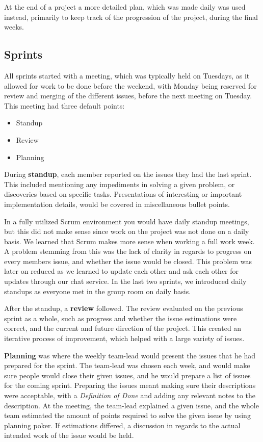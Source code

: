 At the end of a project a more detailed plan, which was made daily was used instead, primarily to keep track of the progression of the project, during the final weeks.

\subsection{Sprints}
All sprints started with a meeting, which was typically held on Tuesdays, as it allowed for work to be done before the weekend, with Monday being reserved for review and merging of the different issues, before the next meeting on Tuesday.
This meeting had three default points:
\begin{itemize}
	\item Standup
	\item Review
	\item Planning
\end{itemize}

During \textbf{standup}, each member reported on the issues they had the last sprint.
This included mentioning any impediments in solving a given problem, or discoveries based on specific tasks.
Presentations of interesting or important implementation details, would be covered in miscellaneous bullet points.

In a fully utilized Scrum environment you would have daily standup meetings, but this did not make sense since work on the project was not done on a daily basis.
We learned that Scrum makes more sense when working a full work week.
A problem stemming from this was the lack of clarity in regards to progress on every members issue, and whether the issue would be closed.
This problem was later on reduced as we learned to update each other and ask each other for updates through our chat service.
In the last two sprints, we introduced daily standups as everyone met in the group room on daily basis.

After the standup, a \textbf{review} followed.
The review evaluated on the previous sprint as a whole, such as progress and whether the issue estimations were correct, and the current and future direction of the project.
This created an iterative process of improvement, which helped with a large variety of issues.

\textbf{Planning} was where the weekly team-lead would present the issues that he had prepared for the sprint.
The team-lead was chosen each week, and would make sure people would close their given issues, and he would prepare a list of issues for the coming sprint.
Preparing the issues meant making sure their descriptions were acceptable, with a \textit{Definition of Done} and adding any relevant notes to the description.
At the meeting, the team-lead explained a given issue, and the whole team estimated the amount of points required to solve the given issue by using planning poker.
If estimations differed, a discussion in regards to the actual intended work of the issue would be held.

